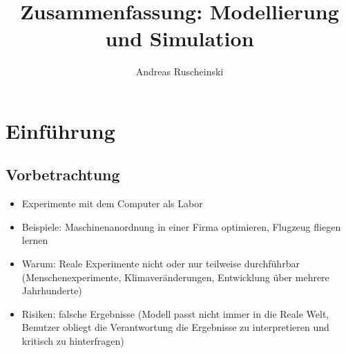 \documentclass[11pt, fleqn, a4paper, leqno]{scrartcl} %
\title{Zusammenfassung: Modellierung und Simulation}
\author{Andreas Ruscheinski}
\date{}
\begin{document}
\maketitle
\tableofcontents
\section{Einführung}
	\subsection{Vorbetrachtung}
	\begin{itemize}
		\item Experimente mit dem Computer als Labor
		\item Beispiele: Maschinenanordnung in einer Firma optimieren, Flugzeug fliegen lernen 
		\item Warum: Reale Experimente nicht oder nur teilweise durchführbar (Menschenexperimente, Klimaveränderungen, Entwicklung über mehrere Jahrhunderte)
		\item Risiken: falsche Ergebnisse (Modell passt nicht immer in die Reale Welt, Benutzer obliegt die Verantwortung die Ergebnisse zu interpretieren und kritisch zu hinterfragen)
	\end{itemize}
\end{document}
